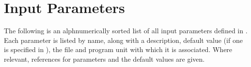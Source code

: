 \chapter{Input Parameters}

The following is an alphnumerically sorted list of all input parameters defined in \glc. Each parameter is listed by name, along with a description, default value (if one is specified in \glc), the file and program unit with which it is associated. Where relevant, references for parameters and the default values are given.



